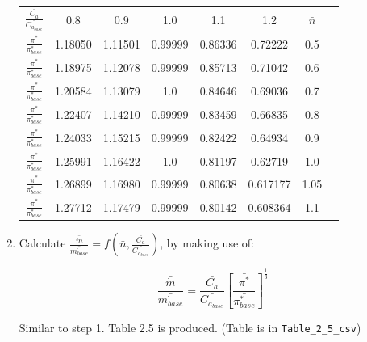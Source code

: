 \documentclass[titlepage]{article}
\begin{document}
\begin{enumerate}
\begin{center}
        \begin{tabular}{c c c c c c c c }
            $\frac{\bar{C_{a}}}{\bar{C_{a_{base}}}}$ & 0.8 & 0.9 & 1.0 & 1.1 & 1.2 & $\bar{n}$ \\
            $\frac{\pi^{*}}{\pi^{*}_{base}}$ & 1.18050 & 1.11501 & 0.99999 & 0.86336 & 0.72222 & 0.5 \\
            $\frac{\pi^{*}}{\pi^{*}_{base}}$ & 1.18975 & 1.12078 & 0.99999 & 0.85713 & 0.71042 & 0.6 \\
            $\frac{\pi^{*}}{\pi^{*}_{base}}$ & 1.20584 & 1.13079 & 1.0 & 0.84646 & 0.69036 & 0.7 \\
            $\frac{\pi^{*}}{\pi^{*}_{base}}$ & 1.22407 & 1.14210 & 0.99999 & 0.83459 & 0.66835 & 0.8 \\
            $\frac{\pi^{*}}{\pi^{*}_{base}}$ & 1.24033 & 1.15215 & 0.99999 &  0.82422 & 0.64934 & 0.9 \\
            $\frac{\pi^{*}}{\pi^{*}_{base}}$ & 1.25991 & 1.16422 & 1.0 & 0.81197 & 0.62719 & 1.0 \\
            $\frac{\pi^{*}}{\pi^{*}_{base}}$ & 1.26899 & 1.16980 & 0.99999 & 0.80638 & 0.617177 & 1.05 \\
            $\frac{\pi^{*}}{\pi^{*}_{base}}$ & 1.27712 & 1.17479 & 0.99999 & 0.80142 & 0.608364 & 1.1 \\
        \end{tabular}
    \end{center}

    \item Calculate $\frac{\bar{\dot{m}}}{\bar{\dot{m_{base}}}} = f (\bar{n}, \frac{\bar{C_{a}}}{\bar{C_{a_{base}}}})$, by making use of:
    
    \begin{equation}
        \frac{\bar{\dot{m}}}{\bar{\dot{m_{base}}}} = \frac{\bar{C_{a}}}{\bar{C_{a_{base}}}} \left[ \frac{\bar{\pi^{*}}}{\bar{\pi^{*}_{base}}} \right] ^{\frac{1}{3}}
    \end{equation}

    Similar to step 1. Table 2.5 is produced. (Table is in \verb|Table_2_5_csv|)


\end{enumerate}
\end{document}
